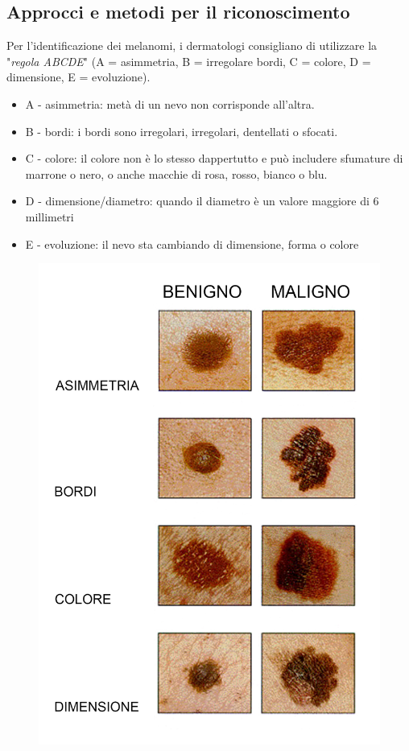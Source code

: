 {\subsection{Approcci e metodi per il riconoscimento}
Per l'identificazione dei melanomi, i dermatologi consigliano di utilizzare  la "\textit{regola ABCDE}" (A = asimmetria, B = irregolare
bordi, C = colore, D = dimensione, E = evoluzione).
\begin{itemize}
	\item A - asimmetria: metà di un nevo non corrisponde all'altra.
	\item B - bordi: i bordi sono irregolari, irregolari, dentellati o sfocati.
	\item C - colore: il colore non è lo stesso dappertutto e può includere sfumature di marrone o nero, o anche macchie di rosa, rosso, bianco o blu.
	\item D - dimensione/diametro: quando il diametro è un valore maggiore di 6 millimetri
	\item E - evoluzione: il nevo sta cambiando di dimensione, forma o colore
\end{itemize}
\begin{figure}[h]
	\begin{center}     
		\includegraphics[scale=0.50]{figure/capitolo1/classificazione.jpg}

\end{center}
\end{figure}}
